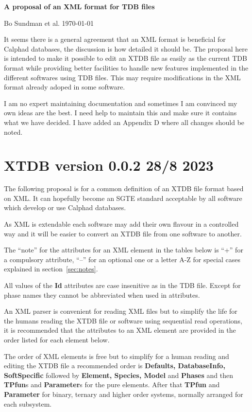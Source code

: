 \documentclass{article}
\begin{document}
\begin{center}

  {\Large \bf A proposal of an XML format for TDB files}

  Bo Sundman et al. \today
\end{center}

It seems there is a general agreement that an XML format is beneficial
for Calphad databases, the discussion is how detailed it should be.
The proposal here is intended to make it possible to edit an XTDB file
as easily as the current TDB format while providing better facilities
to handle new features implemented in the different softwares using
TDB files.  This may require modifications in the XML format already
adoped in some software.

I am no expert maintaining documentation and sometimes I am convinced
my own ideas are the best.  I need help to maintain this and make sure
it contains what we have decided.  I have added an Appendix D where all
changes should be noted.

\section{XTDB version 0.0.2  28/8 2023}

The following proposal is for a common definition of an XTDB file
format based on XML.  It can hopefully become an SGTE standard
acceptable by all software which develop or use Calphad databases.

As XML is extendable each software may add their own flavour in a
controlled way and it will be easier to convert an XTDB file from one
software to another.

The ``note'' for the attributes for an XML element in the tables below
is ``+'' for a compulsory attribute, ``--'' for an optional one or a
letter A-Z for special cases explained in section~\ref{sec:notes}.

All values of the {\bf Id} attributes are case insenitive as in the
TDB file.  Except for phase names they cannot be abbreviated when used
in attributes.

An XML parser is convenient for reading XML files but to simplify the
life for the humans reading the XTDB file or software using sequential
read operations, it is recommended that the attributes to an XML
element are provided in the order listed for each element below.

The order of XML elements is free but to simplify for a human reading
and editing the XTDB file a recommended order is {\bf Defaults,
  DatabaseInfo, SoftSpecific} followed by {\bf Element, Species,
  Model} and {\bf Phases} and then {\bf TPfun}s and {\bf Parameter}s
for the pure elements.  After that {\bf TPfun} and {\bf Parameter} for
binary, ternary and higher order systems, normally arranged for each
subsystem.
\end{document}

